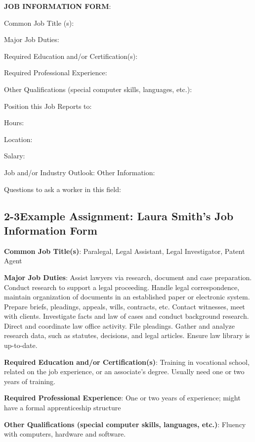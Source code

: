\pagebreak \textbf{JOB INFORMATION FORM}:

Common Job Title (s): \hrulefill

Major Job Duties: \hrulefill

Required Education and/or Certification(s): \hrulefill

Required Professional Experience: \hrulefill

 Other Qualifications (special computer skills, languages, etc.):  \hrulefill

 Position this Job Reports to: \hrulefill

 Hours: \hrulefill

 Location: \hrulefill

 Salary: \hrulefill

 Job and/or Industry Outlook: Other Information: \hrulefill

 Questions to ask a worker in this field: \hrulefill
 
\pagebreak \subsection*{2-3\quad Example Assignment: Laura Smith’s Job Information Form}
\textbf{Common Job Title(s)}: Paralegal, Legal Assistant, Legal Investigator, Patent Agent

\textbf{Major Job Duties}: Assist lawyers via research, document and case preparation. Conduct research to support a legal proceeding. Handle legal correspondence, maintain organization of documents in an established paper or electronic system. Prepare briefs, pleadings, appeals, wills, contracts, etc. Contact witnesses, meet with clients. Investigate facts and law of cases and conduct background research. Direct and coordinate law office activity. File pleadings. Gather and analyze research data, such as statutes, decisions, and legal articles. Ensure law library is up-to-date.

\textbf{Required Education and/or Certification(s)}: Training in vocational school, related on the job experience, or an associate's degree. Usually need one or two years of training.

\textbf{Required Professional Experience}: One or two years of experience; might have a formal apprenticeship structure

\textbf{Other Qualifications (special computer skills, languages, etc.)}: Fluency with computers, hardware and software.

